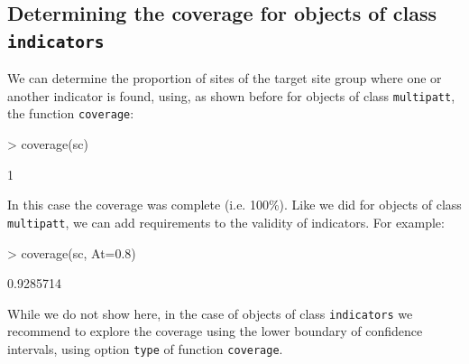 \documentclass[11pt,a4paper]{article}
\begin{document}
\subsection{Determining the coverage for objects of class \texttt{indicators}}
We can determine the proportion of sites of the target site group where one or another indicator is found, using, as shown before for objects of class \texttt{multipatt}, the function \texttt{coverage}:
\begin{Schunk}
\begin{Sinput}
> coverage(sc)
\end{Sinput}
\begin{Soutput}
[1] 1
\end{Soutput}
\end{Schunk}
In this case the coverage was complete (i.e. 100\%). Like we did for objects of class \texttt{multipatt}, we can add requirements to the validity of indicators. For example:
\begin{Schunk}
\begin{Sinput}
> coverage(sc, At=0.8)
\end{Sinput}
\begin{Soutput}
[1] 0.9285714
\end{Soutput}
\end{Schunk}
While we do not show here, in the case of objects of class \texttt{indicators} we recommend to explore the coverage using the lower boundary of confidence intervals, using option \texttt{type} of function \texttt{coverage}. 
\end{document}
